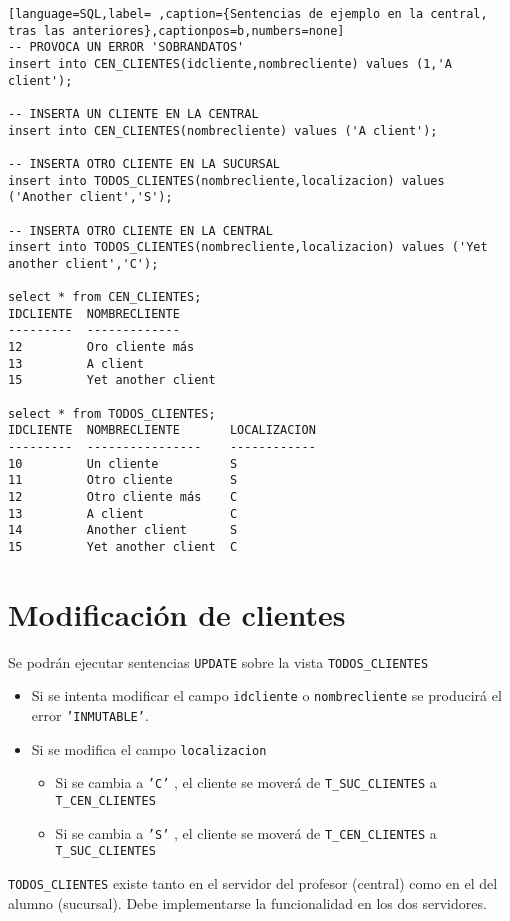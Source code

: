 \documentclass[a4paper]{article}
\begin{document}
\begin{lstlisting}[language=SQL,label= ,caption={Sentencias de ejemplo en la central, tras las anteriores},captionpos=b,numbers=none]
-- PROVOCA UN ERROR 'SOBRANDATOS'
insert into CEN_CLIENTES(idcliente,nombrecliente) values (1,'A client');

-- INSERTA UN CLIENTE EN LA CENTRAL
insert into CEN_CLIENTES(nombrecliente) values ('A client');

-- INSERTA OTRO CLIENTE EN LA SUCURSAL
insert into TODOS_CLIENTES(nombrecliente,localizacion) values ('Another client','S');

-- INSERTA OTRO CLIENTE EN LA CENTRAL
insert into TODOS_CLIENTES(nombrecliente,localizacion) values ('Yet another client','C');

select * from CEN_CLIENTES;
IDCLIENTE  NOMBRECLIENTE
---------  -------------
12         Oro cliente más
13         A client
15         Yet another client

select * from TODOS_CLIENTES;
IDCLIENTE  NOMBRECLIENTE       LOCALIZACION
---------  ----------------    ------------
10         Un cliente          S
11         Otro cliente        S
12         Otro cliente más    C
13         A client            C
14         Another client      S
15         Yet another client  C
\end{lstlisting}

\section{Modificación de clientes}
\label{sec:org0000015}
Se podrán ejecutar sentencias \texttt{UPDATE} sobre la vista \texttt{TODOS\_CLIENTES}
\begin{itemize}
\item Si se intenta modificar el campo \texttt{idcliente} o \texttt{nombrecliente} se producirá el error \texttt{'INMUTABLE'}.
\item Si se modifica el campo \texttt{localizacion}
\begin{itemize}
\item Si se cambia a \texttt{'C'} , el cliente se moverá de \texttt{T\_SUC\_CLIENTES} a \texttt{T\_CEN\_CLIENTES}
\item Si se cambia a \texttt{'S'} , el cliente se moverá de \texttt{T\_CEN\_CLIENTES} a \texttt{T\_SUC\_CLIENTES}
\end{itemize}
\end{itemize}

\begin{Aviso}
\texttt{TODOS\_CLIENTES} existe tanto en el servidor del profesor (central)  como en el del alumno (sucursal). Debe implementarse la funcionalidad en los dos servidores.
\end{Aviso}
\end{document}
